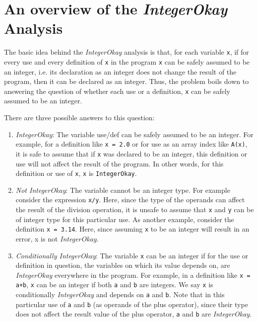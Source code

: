 \section{An overview of the \emph{IntegerOkay} Analysis}
\label{sec:overview}
The basic idea behind the \emph{IntegerOkay} analysis is that, for each 
variable \verb|x|, if for every use and every definition of \verb|x| in the
program \verb|x| can be safely assumed to be an integer, i.e. its
declaration as an integer does not change the result of the program,
then it can be declared as an integer. Thus, the problem boils down to
answering the question of whether each use or a definition,
\verb|x| can be safely assumed to be an integer.

There are three possible answers to this question: 
\begin{enumerate}

\item \emph{IntegerOkay}: The variable use/def can be safely assumed to be an
integer.  For example, for a definition like \texttt{x = 2.0} or for use
as an array index like \texttt{A(x)}, it is safe to assume that if
\verb|x| was declared to be an integer, this definition or use will not
affect the result of the program. In other words, for this definition or
use of \verb|x|, \verb|x| is \texttt{IntegerOkay}.

\item \emph{Not IntegerOkay}: The variable cannot be an integer type.
For example consider the expression \texttt{x/y}. Here, since the type
of the operands can affect the result of the division operation, it is
unsafe to assume that \verb|x| and \verb|y| can be of integer type for
this particular use. As another example, consider the definition
\texttt{x = 3.14}. Here, since assuming \verb|x| to be an integer will
result in an error, x is not \emph{IntegerOkay}. 

\item \emph{Conditionally IntegerOkay}: The variable \verb|x| can be
an integer if for the use or definition in question, the variables on
which its value depends on, are \emph{IntegerOkay} everywhere in the
program. For example, in a definition like \texttt{x = a+b}, \verb|x|
can be an integer if both \verb|a| and \verb|b| are integers. We say
\verb|x| is conditionally \emph{IntegerOkay} and depends on \verb|a| and
\verb|b|. Note that in this particular use of \verb|a| and \verb|b| (as
operands of the plus operator), since their type does not affect the
result value of the plus operator, \verb|a| and \verb|b| are
\emph{IntegerOkay}.        

\end{enumerate}   

